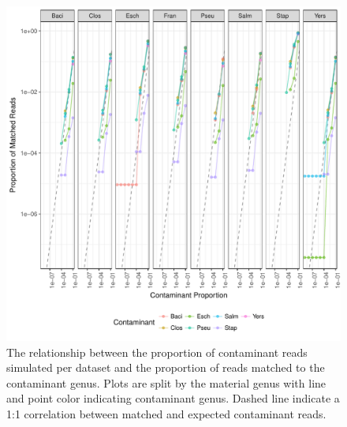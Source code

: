 \documentclass[fleqn,10pt,lineno]{wlpeerj}\usepackage[]{graphicx}\usepackage[]{color}
\makeatletter
\def\maxwidth{ %
  \ifdim\Gin@nat@width>\linewidth
    \linewidth
  \else
    \Gin@nat@width
  \fi
}
\newenvironment{knitrout}{}{} %
\makeatother
\begin{document}
\begin{knitrout}
\color{fgcolor}\begin{figure}
\includegraphics[width=\maxwidth]{figure/contam_fig-1} \caption[The relationship between the proportion of contaminant reads simulated per dataset and the proportion of reads matched to the contaminant genus]{The relationship between the proportion of contaminant reads simulated per dataset and the proportion of reads matched to the contaminant genus. Plots are split by the material genus with line and point color indicating contaminant genus. Dashed line indicate a 1:1 correlation between matched and expected contaminant reads. }\label{fig:contam_fig}
\end{figure}


\end{knitrout}

\end{document}
